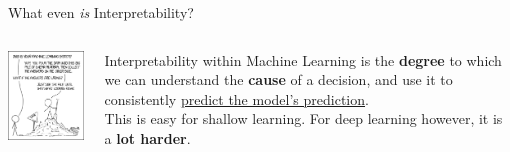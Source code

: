 \documentclass{beamer}
\begin{document}
\begin{frame}{What even \textit{is} Interpretability?}
	\begin{columns}
		\begin{column}{0.5\textwidth}
			\begin{center}
				\includegraphics[width=5cm]{img/1838} \pause
			\end{center}
		\end{column}
		\begin{column}{0.5\textwidth}
			Interpretability within Machine Learning is the \textbf{degree} to which we can understand the \textbf{cause} of a decision, and use it to consistently \underline{predict the model's prediction}. \pause \newline \\

			This is easy for shallow learning. \pause For deep learning however, it is a \textbf{lot harder}.
		\end{column}
	\end{columns}
\end{frame}
\end{document}
